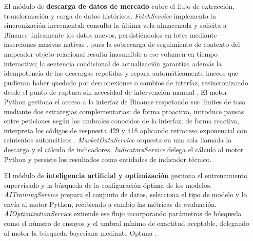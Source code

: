 El módulo de \textbf{descarga de datos de mercado} cubre el flujo de extracción, transformación y carga de datos históricos. \textit{FetchService} implementa la sincronización incremental: consulta la última vela almacenada y solicita a Binance únicamente los datos nuevos, persistiéndolos en lotes mediante inserciones masivas nativas \parencite{oracle_mysql_insert_opt_2024}, pues la sobrecarga de seguimiento de contexto del mapeador objeto-relacional resulta inasumible a ese volumen en tiempo interactivo; la sentencia condicional de actualización garantiza además la idempotencia de las descargas repetidas y repara automáticamente huecos que pudieran haber quedado por desconexiones o cambios de interfaz, resincronizando desde el punto de ruptura sin necesidad de intervención manual \parencite{kimball_data_2004,pardo_evaluation_2008}. El motor Python gestiona el acceso a la interfaz de Binance respetando sus límites de tasa mediante dos estrategias complementarias: de forma proactiva, introduce pausas entre peticiones según los umbrales conocidos de la interfaz; de forma reactiva, interpreta los códigos de respuesta 429 y 418 aplicando retroceso exponencial con reintentos automáticos \parencite{binance_rate_limits_2024,kleppmann_designing_2017}. \textit{MarketDataService} orquesta en una sola llamada la descarga y el cálculo de indicadores. \textit{IndicatorsService} delega el cálculo al motor Python y persiste los resultados como entidades de indicador técnico.

El módulo de \textbf{inteligencia artificial y optimización} gestiona el entrenamiento supervisado y la búsqueda de la configuración óptima de los modelos. \textit{AITrainingService} prepara el conjunto de datos, selecciona el tipo de modelo y lo envía al motor Python, recibiendo a cambio las métricas de evaluación. \textit{AIOptimizationService} extiende ese flujo incorporando parámetros de búsqueda como el número de ensayos y el umbral mínimo de exactitud aceptable, delegando al motor la búsqueda bayesiana mediante Optuna \parencite{feurer_hyperparameter_2019}.

